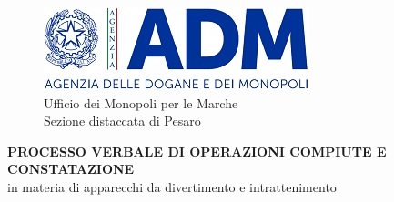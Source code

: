 \documentclass[12pt]{article}
\begin{document}
\thispagestyle{empty}

\begin{figure}[h]
    \centering
    \includegraphics{logo-adm.jpg}
    \caption*{Ufficio dei Monopoli per le Marche\\Sezione distaccata di Pesaro}
    \label{fig:logoadm}
\end{figure}

{\centering
    \textbf{PROCESSO VERBALE DI OPERAZIONI COMPIUTE E CONSTATAZIONE}\\in materia di apparecchi da divertimento e intrattenimento
    \par
}
\end{document}

